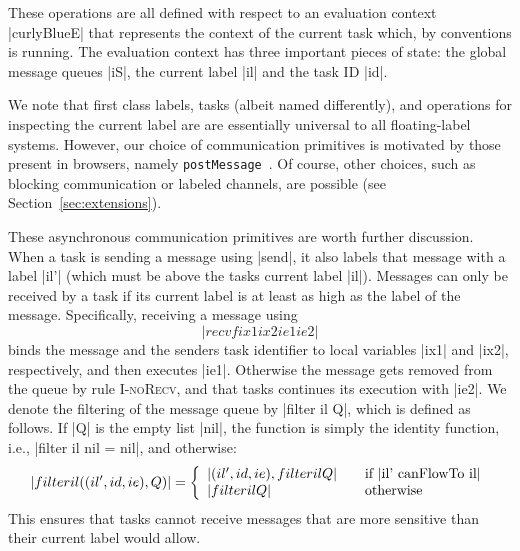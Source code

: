 These operations are all defined with respect to an evaluation context
|curlyBlueE| that represents the context of the current task which, by
conventions is running. The evaluation context has three important pieces of
state: the global message queues |iS|, the current label |il| and the task ID |id|.
 
We note that first class labels, tasks (albeit named differently), and
operations for inspecting the current label are are essentially universal to
all floating-label systems.
%
However, our choice of communication primitives is motivated by
those present in browsers, namely \texttt{postMessage}~\cite{webmessaging}.
%
Of course, other choices, such as blocking communication or labeled channels,
are possible (see Section~\ref{sec:extensions}).
%

These asynchronous communication primitives are worth further
discussion.  When a task is sending a message using |send|, it also labels that
message with a label |il'| (which must be above the tasks current label |il|).
Messages can only be received by a task if its current label is
at least as high as the label of the message.
Specifically, receiving a message using
\[ |recvf ix1 ix2 ie1 ie2| \]
binds the message and the senders task identifier
to local variables |ix1| and |ix2|, respectively, and then executes |ie1|.
Otherwise the message gets removed from the queue by rule \textsc{I-noRecv},
and that tasks continues its execution with |ie2|.
We denote the filtering of the message queue by |filter il Q|,
which is defined as follows.
If |Q| is the empty list |nil|, the
function is simply the identity function, i.e.,
|filter il nil = nil|, and otherwise:
\[
|filter il ((il', id, ie) , Q )| = \left\{
\begin{array}{l l}
|(il', id, ie) , filter il Q| & \quad \text{if |il' canFlowTo il|}\\
|filter il Q| & \quad \text{otherwise}
\end{array} \right.
\]
This ensures that tasks cannot receive messages that are more sensitive
than their current label would allow.

